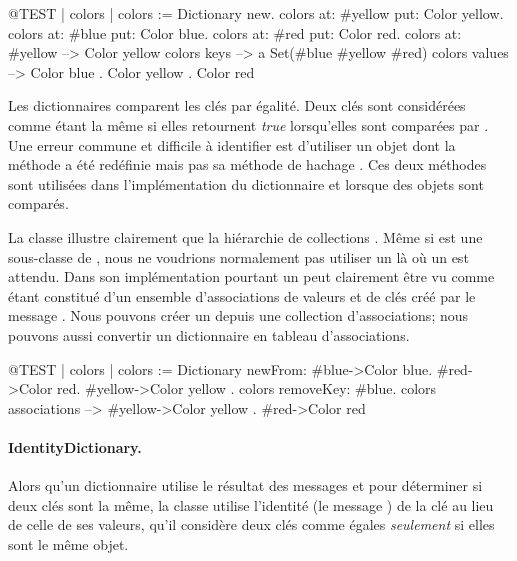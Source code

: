 \documentclass[a4paper,10pt,twoside]{book}
\begin{document}
\begin{code}{@TEST | colors |}
colors := Dictionary new.
colors at: #yellow put: Color yellow.
colors at: #blue put: Color blue.
colors at: #red put: Color red.
colors at: #yellow --> Color yellow
colors keys          --> a Set(#blue #yellow #red)
colors values       --> {Color blue . Color yellow . Color red}
\end{code}

Les dictionnaires comparent les cl\'es par \'egalit\'e. Deux cl\'es sont
consid\'er\'ees comme \'etant la m\^eme si elles retournent \emph{true}
lorsqu'elles sont compar\'ees par \ct{=}. Une erreur commune et difficile \`a
identifier est d'utiliser un objet dont la m\'ethode \ct{=} a \'et\'e
red\'efinie mais pas sa m\'ethode de hachage . Ces deux
m\'ethodes sont utilis\'ees dans l'impl\'ementation du dictionnaire
et lorsque des objets sont compar\'es.

La classe  illustre clairement que la hi\'erarchie
de collections .
M\^eme si  est une sous-classe de , nous
ne voudrions normalement pas utiliser un  l\`a o\`u
un  est attendu. 
Dans son impl\'ementation pourtant un  peut
clairement \^etre vu comme \'etant constitu\'e d'un ensemble d'associations
de valeurs et de cl\'es cr\'e\'e par le message . Nous
pouvons cr\'eer un  depuis une collection d'associations; nous
pouvons aussi convertir un dictionnaire en tableau d'associations.

\begin{code}{@TEST | colors |}
colors := Dictionary newFrom: { #blue->Color blue. #red->Color red. #yellow->Color yellow }.
colors removeKey: #blue.
colors associations --> {#yellow->Color yellow . #red->Color red}
\end{code}

\paragraph{IdentityDictionary.}
Alors qu'un dictionnaire utilise le r\'esultat des messages \ct{=} et  pour d\'eterminer si deux cl\'es sont la m\^eme, la classe  utilise l'identit\'e (\cad le message ) de la cl\'e au lieu de celle de ses valeurs, \ie qu'il consid\`ere deux cl\'es comme \'egales \emph{seulement} si elles sont le m\^eme objet.
\end{document}
